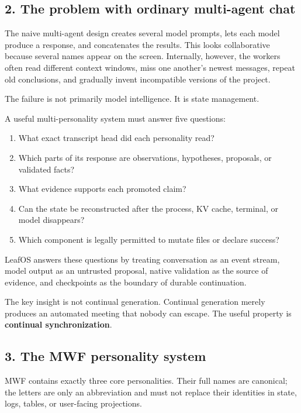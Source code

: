 \subsection{2. The problem with ordinary multi-agent chat}

The naive multi-agent design creates several model prompts, lets each model
produce a response, and concatenates the results. This looks collaborative
because several names appear on the screen. Internally, however, the workers
often read different context windows, miss one another's newest messages, repeat
old conclusions, and gradually invent incompatible versions of the project.

The failure is not primarily model intelligence. It is state management.

A useful multi-personality system must answer five questions:

\begin{enumerate}
\def\labelenumi{\arabic{enumi}.}
\item
  What exact transcript head did each personality read?
\item
  Which parts of its response are observations, hypotheses, proposals, or
  validated facts?
\item
  What evidence supports each promoted claim?
\item
  Can the state be reconstructed after the process, KV cache, terminal, or
  model disappears?
\item
  Which component is legally permitted to mutate files or declare success?
\end{enumerate}

LeafOS answers these questions by treating conversation as an event stream,
model output as an untrusted proposal, native validation as the source of
evidence, and checkpoints as the boundary of durable continuation.

The key insight is not continual generation. Continual generation merely
produces an automated meeting that nobody can escape. The useful property is
\textbf{continual synchronization}.

\subsection{3. The MWF personality system}

MWF contains exactly three core personalities. Their full names are canonical;
the letters are only an abbreviation and must not replace their identities in
state, logs, tables, or user-facing projections.

